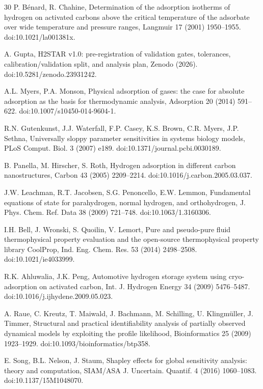 \documentclass[preprint,12pt]{elsarticle}
\begin{document}
\begin{thebibliography}{30}
 P. B\'enard, R. Chahine, Determination of the
adsorption isotherms of hydrogen on activated carbons above the critical
temperature of the adsorbate over wide temperature and pressure ranges,
Langmuir 17 (2001) 1950--1955. doi:10.1021/la001381x.

 A. Gupta, H2STAR v1.0: pre-registration of validation
gates, tolerances, calibration/validation split, and analysis plan, Zenodo
(2026). doi:10.5281/zenodo.23931242.

 A.L. Myers, P.A. Monson, Physical adsorption of gases:
the case for absolute adsorption as the basis for thermodynamic analysis,
Adsorption 20 (2014) 591--622. doi:10.1007/s10450-014-9604-1.

 R.N. Gutenkunst, J.J. Waterfall, F.P. Casey, K.S.
Brown, C.R. Myers, J.P. Sethna, Universally sloppy parameter sensitivities
in systems biology models, PLoS Comput. Biol. 3 (2007) e189.
doi:10.1371/journal.pcbi.0030189.

 B. Panella, M. Hirscher, S. Roth, Hydrogen adsorption
in different carbon nanostructures, Carbon 43 (2005) 2209--2214.
doi:10.1016/j.carbon.2005.03.037.

 J.W. Leachman, R.T. Jacobsen, S.G. Penoncello, E.W.
Lemmon, Fundamental equations of state for parahydrogen, normal hydrogen,
and orthohydrogen, J. Phys. Chem. Ref. Data 38 (2009) 721--748.
doi:10.1063/1.3160306.

 I.H. Bell, J. Wronski, S. Quoilin, V. Lemort, Pure and
pseudo-pure fluid thermophysical property evaluation and the open-source
thermophysical property library CoolProp, Ind. Eng. Chem. Res. 53 (2014)
2498--2508. doi:10.1021/ie4033999.

 R.K. Ahluwalia, J.K. Peng, Automotive hydrogen
storage system using cryo-adsorption on activated carbon, Int. J. Hydrogen
Energy 34 (2009) 5476--5487. doi:10.1016/j.ijhydene.2009.05.023.

 A. Raue, C. Kreutz, T. Maiwald, J. Bachmann, M. Schilling,
U. Klingm\"uller, J. Timmer, Structural and practical identifiability
analysis of partially observed dynamical models by exploiting the profile
likelihood, Bioinformatics 25 (2009) 1923--1929.
doi:10.1093/bioinformatics/btp358.

 E. Song, B.L. Nelson, J. Staum, Shapley effects for
global sensitivity analysis: theory and computation, SIAM/ASA J. Uncertain.
Quantif. 4 (2016) 1060--1083. doi:10.1137/15M1048070.


\end{thebibliography}
\end{document}

